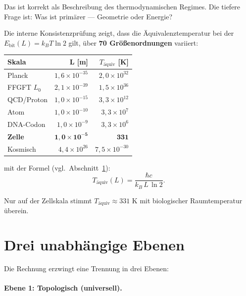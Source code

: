 Das ist korrekt als Beschreibung des thermodynamischen Regimes.
Die tiefere Frage ist: Was ist primärer — Geometrie oder Energie?

Die interne Konsistenzprüfung zeigt, dass die Äquivalenztemperatur
bei der \(E_\text{bit}(L) = k_B T \ln 2\) gilt,
über \textbf{70 Größenordnungen} variiert:

\begin{center}
\renewcommand{\arraystretch}{1.4}
\begin{tabular}{lrr}
\toprule
\textbf{Skala} & \textbf{L [m]} & \textbf{\(T_\text{äquiv}\) [K]} \\
\midrule
Planck        & \(1{,}6 \times 10^{-35}\) & \(2{,}0 \times 10^{32}\) \\
FFGFT \(L_0\) & \(2{,}1 \times 10^{-39}\) & \(1{,}5 \times 10^{36}\) \\
QCD/Proton    & \(1{,}0 \times 10^{-15}\) & \(3{,}3 \times 10^{12}\) \\
Atom          & \(1{,}0 \times 10^{-10}\) & \(3{,}3 \times 10^{7}\)  \\
DNA-Codon     & \(1{,}0 \times 10^{-9}\)  & \(3{,}3 \times 10^{6}\)  \\
\textbf{Zelle} & \(\mathbf{1{,}0 \times 10^{-5}}\) & \(\mathbf{331}\) \\
Kosmisch      & \(4{,}4 \times 10^{26}\) & \(7{,}5 \times 10^{-30}\) \\
\bottomrule
\end{tabular}
\end{center}

mit der Formel (vgl.\ Abschnitt~\ref{sec:drei}):
\begin{equation}
  T_\text{äquiv}(L) = \frac{\hbar c}{k_B \, L \, \ln 2}.
  \label{eq:Taequiv}
\end{equation}

Nur auf der Zellskala stimmt \(T_\text{äquiv} \approx 331\) K
mit biologischer Raumtemperatur überein.

\section{Drei unabhängige Ebenen}
\label{sec:drei}

Die Rechnung erzwingt eine Trennung in drei Ebenen:

\paragraph{Ebene 1: Topologisch (universell).}

